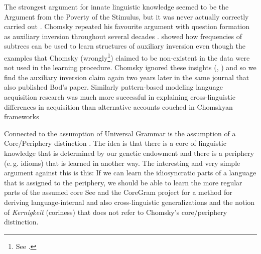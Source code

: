 The strongest argument for innate linguistic knowledge seemed to be the Argument from the Poverty of the Stimulus, but
it was never actually correctly carried out \citep{PS2002a,SP2002b}. Chomsky repeated his favourite argument
with question formation as auxiliary inversion throughout several decades \parencites[--33]{Chomsky71a-u}[]{Chomsky2013a}. \citet{Bod2009a} showed
how frequencies of subtrees can be used to learn structures of auxiliary inversion even though the
examples that Chomsky (wrongly\footnote{%
See \citet[--45]{PS2002a}.
}) claimed to be non-existent in the data were not used in the learning
procedure. Chomsky ignored these insights (\citealt*{BPYC2011a}, \citealt[]{Chomsky2013a}) and so we
find the auxiliary inversion claim again two years later in the same journal that also published Bod's paper.
Similarly pattern-based modeling language acquisition research was much more successful in explaining
cross-linguistic differences in acquisition than alternative accounts couched in Chomskyan
frameworks 
\iftoggle{long}{\citep{FPG2006a,FPAG2007a,FPG2009a}.}%
{\citep{FPAG2007a}.} 


Connected to the assumption of Universal Grammar is the assumption of a Core/Periphery
distinction 
\iftoggle{long}{%
\parencites[\page 7--8]{Chomsky81a}[\page 150--151]{Chomsky86a}[\page 343]{Fodor98a}}{%
\parencites[\page 7--8]{Chomsky81a}}. The idea is that there is a core of linguistic knowledge that is determined by our
genetic endowment and there is a periphery (e.\,g. idioms) that is learned in another way. The interesting and very
simple argument against this is this: If we can learn the idiosyncratic parts of a language that is
assigned to the periphery, we should be able to learn the more regular parts of the assumed core
\iftoggle{long}{%
\parencites[\page 20]{Abney96a}[\page 222]{Goldberg2003b}[\page 14]{Goldberg2006a}[\page 100]{Newmeyer2005a}[\page 36]{Tomasello2006a}[\page
20]{Tomasello2006c}{MuellerKernigkeit}.}{%
\parencites[\page 20]{Abney96a}[\page 14]{Goldberg2006a}[\page 100]{Newmeyer2005a}[\page
20]{Tomasello2006c}{MuellerKernigkeit}.} 
See  and the CoreGram project \citep{MuellerCoreGram}
for a method for deriving language-internal and also cross-linguistic generalizations and the notion
of \emph{Kernigkeit} (coriness) that does not refer to Chomsky's core/periphery distinction. 

